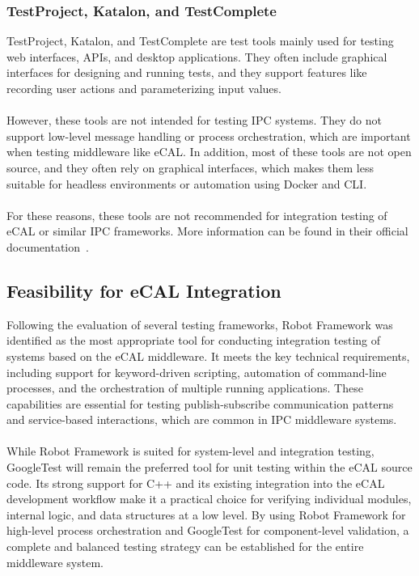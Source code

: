 \subsubsection*{TestProject, Katalon, and TestComplete}

TestProject, Katalon, and TestComplete are test tools mainly used for testing web interfaces, APIs, and desktop applications. They often include graphical interfaces for designing and running tests, and they support features like recording user actions and parameterizing input values.
\\
\\
However, these tools are not intended for testing IPC systems. They do not support low-level message handling or process orchestration, which are important when testing middleware like eCAL. In addition, most of these tools are not open source, and they often rely on graphical interfaces, which makes them less suitable for headless environments or automation using Docker and CLI.
\\
\\
For these reasons, these tools are not recommended for integration testing of eCAL or similar IPC frameworks. More information can be found in their official documentation~\cite{TestProjectDocs,KatalonDocs,TestCompleteDocs}.



\subsection{Feasibility for eCAL Integration}

Following the evaluation of several testing frameworks, Robot Framework was identified as the most appropriate tool for conducting integration testing of systems based on the eCAL middleware. It meets the key technical requirements, including support for keyword-driven scripting, automation of command-line processes, and the orchestration of multiple running applications. These capabilities are essential for testing publish-subscribe communication patterns and service-based interactions, which are common in IPC middleware systems.
\\
\\
While Robot Framework is suited for system-level and integration testing, GoogleTest will remain the preferred tool for unit testing within the eCAL source code. Its strong support for C++ and its existing integration into the eCAL development workflow make it a practical choice for verifying individual modules, internal logic, and data structures at a low level. By using Robot Framework for high-level process orchestration and GoogleTest for component-level validation, a complete and balanced testing strategy can be established for the entire middleware system.

